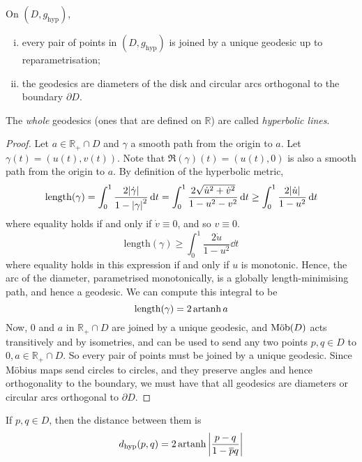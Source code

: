 \begin{lemma}
	On \( (D, g_{\text{hyp}}) \),
	\begin{enumerate}[(i)]
		\item every pair of points in \( (D, g_{\text{hyp}}) \) is joined by a unique geodesic up to reparametrisation;
		\item the geodesics are diameters of the disk and circular arcs orthogonal to the boundary \( \partial D \).
	\end{enumerate}
	The \textit{whole} geodesics (ones that are defined on \( \mathbb R \)) are called \textit{hyperbolic lines}.
\end{lemma}
\begin{proof}
	Let \( a \in \mathbb R_+ \cap D \) and \( \gamma \) a smooth path from the origin to \( a \).
	Let \( \gamma(t) = (u(t),v(t)) \).
	Note that \( \Re(\gamma)(t) = (u(t),0) \) is also a smooth path from the origin to \( a \).
	By definition of the hyperbolic metric,
	\[ \mathrm{length}(\gamma) = \int_0^1 \frac{2\abs{\dot \gamma}}{1 - \abs{\gamma}^2} \dd{t} = \int_0^1 \frac{2\sqrt{\dot u^2 + \dot v^2}}{1-u^2 - v^2} \dd{t} \geq \int_0^1 \frac{2 \abs{\dot u}}{1-u^2} \dd{t} \]
	where equality holds if and only if \( \dot v \equiv 0 \), and so \( v \equiv 0 \).
	\[ \mathrm{length}(\gamma) \geq \int_0^1 \frac{2 \dot u}{1-u^2} \dd{t} \]
	where equality holds in this expression if and only if \( u \) is monotonic.
	Hence, the arc of the diameter, parametrised monotonically, is a globally length-minimising path, and hence a geodesic.
	We can compute this integral to be
	\[ \mathrm{length}(\gamma) = 2\operatorname{artanh} a \]
	Now, \( 0 \) and \( a \) in \( \mathbb R_+ \cap D \) are joined by a unique geodesic, and \( \text{M\"ob}(D) \) acts transitively and by isometries, and can be used to send any two points \( p,q \in D \) to \( 0,a \in \mathbb R_+ \cap D \).
	So every pair of points must be joined by a unique geodesic.
	Since M\"obius maps send circles to circles, and they preserve angles and hence orthogonality to the boundary, we must have that all geodesics are diameters or circular arcs orthogonal to \( \partial D \).
\end{proof}
\begin{corollary}
	If \( p, q \in D \), then the distance between them is
	\[ d_{\text{hyp}}(p,q) = 2 \operatorname{artanh} \abs{\frac{p-q}{1-\overline p q}} \]
\end{corollary}

